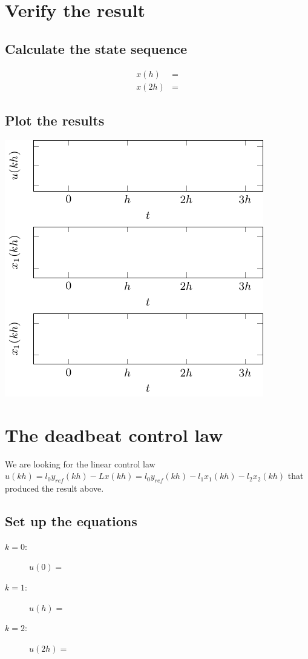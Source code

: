\documentclass[letterpaper,fleqn]{scrartcl}
\begin{document}
\newpage

\section*{Verify the result}
\label{sec-2}

\subsection*{Calculate the state sequence}
\label{sec-2-1}
\begin{align*}
x(h) &= \\
x(2h) &= 
\end{align*}

\subsection*{Plot the results}
\label{sec-2-2}
\begin{center}
\includegraphics[width=0.6\linewidth]{../figures/empty-input-state-sequences}
\end{center}

\section*{The deadbeat control law}
\label{sec-3}
We are looking for the linear control law \(u(kh) = l_0y_{ref}(kh) - Lx(kh) = l_0y_{ref}(kh) - l_1x_1(kh) -l_2x_2(kh)\) that produced the result above.
\subsection*{Set up the equations}
\label{sec-3-1}
\begin{description}
\item[{\(k=0\):}] \(u(0) = \)
\item[{\(k=1\):}] \(u(h) = \)
\item[{\(k=2\):}] \(u(2h) = \)
\end{description}
\end{document}
